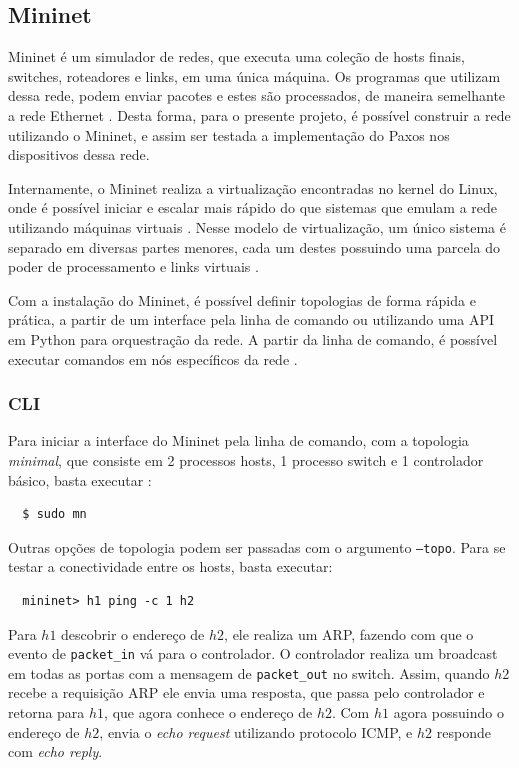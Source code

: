 \documentclass[
    12pt,
    openright, 
    oneside,
    a4paper,
    french,
    english,
    brazil
    ]{facom-ufu-abntex2}
\theoremstyle{definition}
\begin{document}
\subsection{Mininet}
Mininet é um simulador de redes, que executa uma coleção de hosts finais, switches, 
roteadores e links, em uma única máquina. Os programas que utilizam dessa rede, podem enviar
pacotes e estes são processados, de maneira semelhante a rede Ethernet \cite{mininetDocs}.
Desta forma, para o presente projeto, é possível construir a rede utilizando o Mininet, e 
assim ser testada a implementação do Paxos nos dispositivos dessa rede.

Internamente, o Mininet realiza a virtualização encontradas no kernel do Linux, onde é possível
iniciar e escalar mais rápido do que sistemas que emulam a rede utilizando máquinas virtuais
\cite{mininetDocs}. Nesse modelo de virtualização, um único sistema é separado em diversas
partes menores, cada um destes possuindo uma parcela do poder de processamento e links virtuais
\cite{mininetDocs}.

Com a instalação do Mininet, é possível definir topologias de forma rápida e prática, a partir
de um interface pela linha de comando ou utilizando uma API em Python para orquestração da rede.
A partir da linha de comando, é possível executar comandos em nós específicos da rede 
\cite{mininetDocs}. 

\subsubsection{CLI}
Para iniciar a interface do Mininet pela linha de comando, com a topologia
\textit{minimal}, que consiste em 2 processos hosts, 1 processo switch e 1 controlador
básico, basta executar \cite{mininetOrg}:

\begin{verbatim}
  $ sudo mn
\end{verbatim}

Outras opções de topologia podem ser passadas com o argumento \texttt{--topo}. Para se testar a
conectividade entre os hosts, basta executar:

\begin{verbatim}
  mininet> h1 ping -c 1 h2
\end{verbatim}

Para $h1$ descobrir o endereço de $h2$, ele realiza um ARP, fazendo com que o evento de 
\texttt{packet\_in} vá para o controlador. O controlador realiza um broadcast em todas as portas
com a mensagem de \texttt{packet\_out} no switch. Assim, quando $h2$ recebe a requisição ARP ele
envia uma resposta, que passa pelo controlador e retorna para $h1$, que agora conhece o endereço
de $h2$. Com $h1$ agora possuindo o endereço de $h2$, envia o \textit{echo request} utilizando
protocolo ICMP, e $h2$ responde com \textit{echo reply}.
\end{document}
